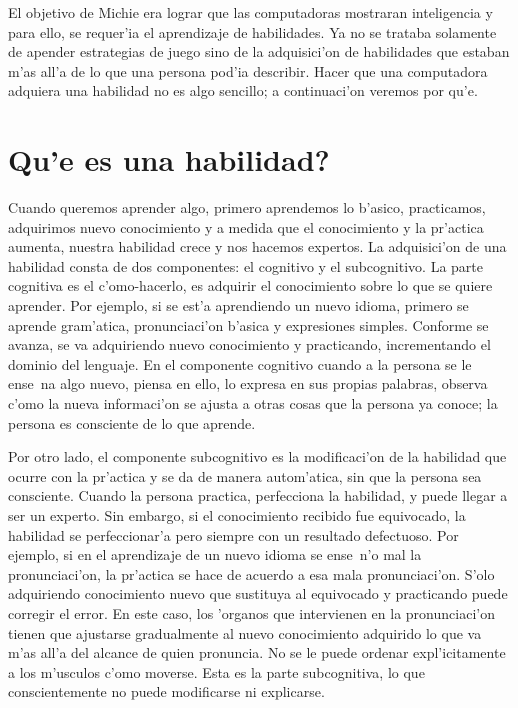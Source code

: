 \documentclass[11pt]{article}
\begin{document}
El objetivo de Michie era lograr que las computadoras mostraran inteligencia y para ello, se requer'ia el aprendizaje de habilidades. Ya no se trataba solamente de apender estrategias de juego sino de la adquisici'on de habilidades que estaban m'as all'a de lo que una persona pod'ia describir. Hacer que una computadora adquiera una habilidad no es algo sencillo; a continuaci'on veremos por qu'e.

\section{\textquestiondown Qu'e es una habilidad?} 

Cuando queremos aprender algo, primero aprendemos lo b'asico, practicamos, adquirimos nuevo conocimiento y a medida que el conocimiento y la pr'actica aumenta, nuestra habilidad crece y nos hacemos expertos. La adquisici'on de una habilidad consta de dos componentes: el cognitivo y el subcognitivo. La parte cognitiva es el c'omo-hacerlo, es adquirir el conocimiento sobre lo que se quiere aprender. Por ejemplo, si se est'a aprendiendo un nuevo idioma, primero se aprende gram'atica, pronunciaci'on b'asica y expresiones simples. Conforme se avanza, se va adquiriendo nuevo conocimiento y practicando, incrementando el dominio del lenguaje. En el componente cognitivo cuando a la persona se le ense~na algo nuevo, piensa en ello, lo expresa en sus propias palabras, observa c'omo la nueva informaci'on se ajusta a otras cosas que la persona ya conoce; la persona es consciente de lo que aprende.

\medskip
Por otro lado, el componente subcognitivo es la modificaci'on de la habilidad que ocurre con la pr'actica y se da de manera autom'atica, sin que la persona sea consciente. Cuando la persona practica, perfecciona la habilidad, y puede llegar a ser un experto. Sin embargo, si el conocimiento recibido fue equivocado, la habilidad se perfeccionar'a pero siempre con un resultado defectuoso. Por ejemplo, si en el aprendizaje de un nuevo idioma se ense~n'o mal la pronunciaci'on, la pr'actica se hace de acuerdo a esa mala pronunciaci'on. S'olo adquiriendo conocimiento nuevo que sustituya al equivocado y practicando puede corregir el error. En este caso, los 'organos que intervienen en la pronunciaci'on tienen que ajustarse gradualmente al nuevo conocimiento adquirido lo que va m'as all'a del alcance de quien pronuncia. No se le puede ordenar expl'icitamente a los m'usculos c'omo moverse. Esta es la parte subcognitiva, lo que conscientemente no puede modificarse ni explicarse.
\end{document}
